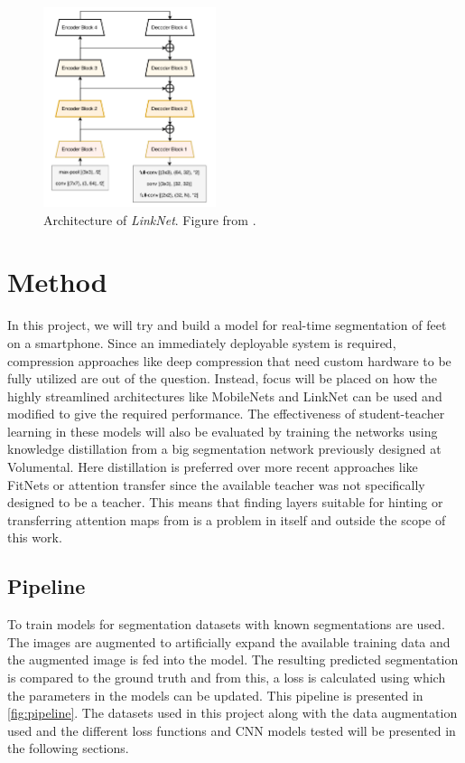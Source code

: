 \documentclass{kththesis}
\begin{document}
\begin{figure}[h]
  \centering
  \includegraphics[width=0.45\textwidth]{LinkNet}
  \caption{Architecture of \textit{LinkNet}. Figure from \textcite{chaurasia2017linknet}.}
  \label{fig:LinkNet}
\end{figure}


\chapter{Method} \label{chap:method}

In this project, we will try and build a model for real-time segmentation of feet
on a smartphone. Since an immediately deployable system is required,
compression approaches like deep compression that need custom hardware to be
fully utilized are out of the question. Instead, focus will be placed on how
the highly streamlined architectures like MobileNets and LinkNet can be used and
modified to give the required performance. The effectiveness of
student-teacher learning in these models will also be evaluated by training the
networks using knowledge distillation from a big segmentation network previously
designed at Volumental. Here distillation is preferred over more recent
approaches like FitNets or attention transfer since the available teacher was
not specifically designed to be a teacher. This means that finding layers suitable for hinting or
transferring attention maps from is a problem in itself and outside the
scope of this work.%

\section{Pipeline}
To train models for segmentation datasets with known segmentations are used. The
images are augmented to artificially expand the available training data and the
augmented image is fed into the model. The resulting predicted segmentation
is compared to the ground truth and from this, a loss is calculated using which
the parameters in the models can be updated. This pipeline is presented in
\cref{fig:pipeline}. The datasets used in this project along with the data
augmentation used and the different loss functions and CNN models tested will be
presented in the following sections.
\end{document}
